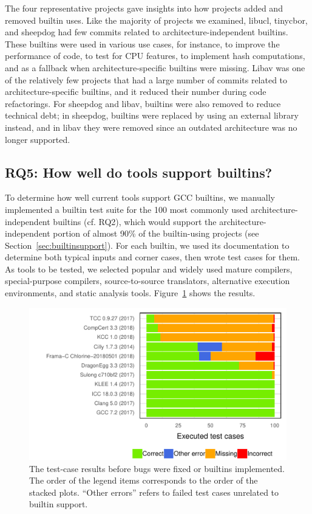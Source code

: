 \documentclass[sigconf,screen]{acmart}
\begin{document}
The four representative projects gave insights into how projects added and removed builtin uses.
Like the majority of projects we examined, libucl, tinycbor, and sheepdog had few commits related to architecture-independent builtins.
These builtins were used in various use cases, for instance, to improve the performance of code, to test for CPU features, to implement hash computations, and as a fallback when architecture-specific builtins were missing.
Libav was one of the relatively few projects that had a large number of commits related to architecture-specific builtins, and it reduced their number during code refactorings.
For sheepdog and libav, builtins were also removed to reduce technical debt; in sheepdog, builtins were replaced by using an external library instead, and in libav they were removed since an outdated architecture was no longer supported.


\subsection{RQ5: How well do tools support builtins?}
To determine how well current tools support GCC builtins, we manually implemented a builtin test suite for the 100 most commonly used architecture-independent builtins (cf. RQ2), which would support the architecture-independent portion of almost 90\% of the builtin-using projects (see Section~\ref{sec:builtinsupport}).
For each builtin, we used its documentation to determine both typical inputs and corner cases, then wrote test cases for them.
As tools to be tested, we selected popular and widely used mature compilers, special-purpose compilers, source-to-source translators, alternative execution environments, and static analysis tools.
Figure~\ref{img:tool-evaluation} shows the results.

\begin{figure}[tb]
    \centering
    \includegraphics[width=\columnwidth]{../generated/plots/tool-evaluation.pdf}
    \caption{The test-case results before bugs were fixed or builtins implemented. The order of the legend items corresponds to the order of the stacked plots. ``Other errors'' refers to failed test cases unrelated to builtin support.}
    \label{img:tool-evaluation}
\end{figure}
\end{document}
